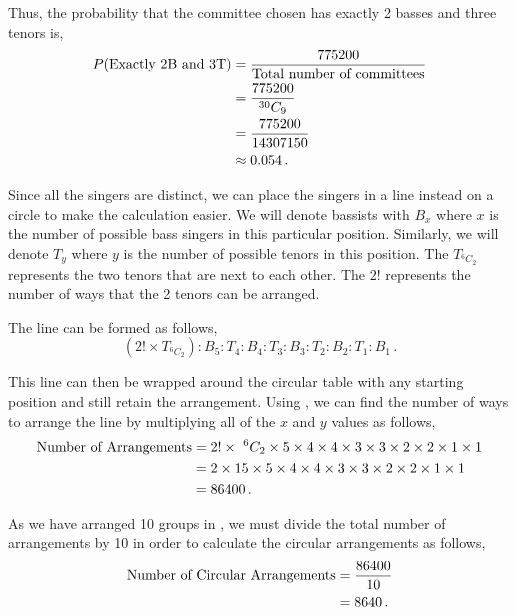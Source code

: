 \begin{subquestions}
\begin{subsubquestions}
Thus, the probability that the committee chosen has exactly 2 basses and three tenors is,
\begin{align}
	P(\text{Exactly 2B and 3T}) & = \frac{775200}{\text{Total number of committees}} \nonumber \\
	                            & = \frac{775200}{^{30}C_9} \nonumber \\
	                            & = \frac{775200}{14307150} \nonumber \\
	                            & \approx 0.054 \,.
\end{align}


\subsubquestion 

Since all the singers are distinct, we can place the singers in a line instead on a circle to make the calculation easier. We will denote bassists with $B_x$ where $x$ is the number of possible bass singers in this particular position. Similarly, we will denote $T_y$ where $y$ is the number of possible tenors in this position. The $T_{^6C_2}$ represents the two tenors that are next to each other. The $2!$ represents the number of ways that the 2 tenors can be arranged.

The line can be formed as follows,
\begin{equation}
	(2! \times T_{^6C_2}):B_5: T_4: B_4: T_3: B_3: T_2: B_2: T_1: B_1 \,. \label{2014:q4:LineInstr}
\end{equation}

This line can then be wrapped around the circular table with any starting position and still retain the arrangement. Using , we can find the number of ways to arrange the line by multiplying all of the $x$ and $y$ values as follows,
\begin{align}
	\text{Number of Arrangements} & = 2! \times ~^6C_2 \times 5\times 4\times 4\times 3\times 3\times 2\times 2\times 1\times 1 \nonumber \\
	                       & = 2 \times 15 \times 5\times 4\times 4\times 3\times 3\times 2\times 2\times 1\times 1 \nonumber \\
	                       & = 86400 \,.
\end{align}

As we have arranged 10 groups in , we must divide the total number of arrangements by 10 in order to calculate the circular arrangements as follows,
\begin{align}
	\text{Number of Circular Arrangements} & = \frac{86400}{10} \nonumber \\
	                                       & = 8640 \,.
\end{align}

\end{subsubquestions}
	
	
	
\end{subquestions}